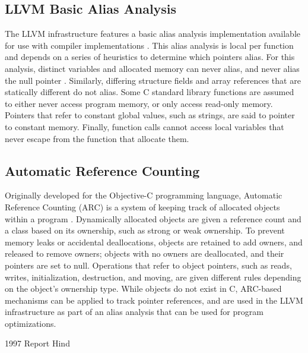 \subsection{LLVM Basic Alias Analysis}
The LLVM infrastructure features a basic alias analysis implementation available for use with compiler implementations \cite{llvmaa}. This alias analysis is local per function and depends on a series of heuristics to determine which pointers alias. For this analysis, distinct variables and allocated memory can never alias, and never alias the null pointer \cite{llvmaa}. Similarly, differing structure fields and array references that are statically different do not alias. Some C standard library functions are assumed to either never access program memory, or only access read-only memory. Pointers that refer to constant global values, such as strings, are said to pointer to constant memory. Finally, function calls cannot access local variables that never escape from the function that allocate them.

\subsection{Automatic Reference Counting}
Originally developed for the Objective-C programming language, Automatic Reference Counting (ARC) is a system of keeping track of allocated objects within a program \cite{ARC}. Dynamically allocated objects are given a reference count and a class based on its ownership, such as strong or weak ownership. To prevent memory leaks or accidental deallocations, objects are retained to add owners, and released to remove owners; objects with no owners are deallocated, and their pointers are set to null. Operations that refer to object pointers, such as reads, writes, initialization, destruction, and moving, are given different rules depending on the object's ownership type. While objects do not exist in C, ARC-based mechanisms can be applied to track pointer references, and are used in the LLVM infrastructure as part of an alias analysis that can be used for program optimizations.

1997 Report Hind

